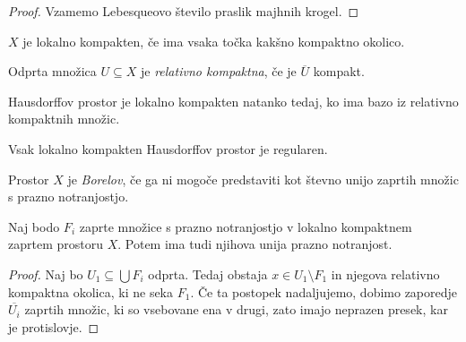 \begin{proof}
Vzamemo Lebesqueovo število praslik majhnih krogel.
\end{proof}

\begin{definicija}
$X$ je lokalno kompakten, če ima vsaka točka kakšno kompaktno
okolico.
\end{definicija}

\begin{definicija}
Odprta množica $U \subseteq X$ je \emph{relativno kompaktna}, če je
$\overline{U}$ kompakt.
\end{definicija}

\begin{trditev}
Hausdorffov prostor je lokalno kompakten natanko tedaj, ko ima bazo
iz relativno kompaktnih množic.
\end{trditev}


\begin{izrek}
Vsak lokalno kompakten Hausdorffov prostor je regularen.
\end{izrek}


\begin{definicija}
Prostor $X$ je \emph{Borelov}, če ga ni mogoče predstaviti kot
števno unijo zaprtih množic s prazno notranjostjo.
\end{definicija}

\begin{izrek}
Naj bodo $F_i$ zaprte množice s prazno notranjostjo v lokalno
kompaktnem zaprtem prostoru $X$. Potem ima tudi njihova unija
prazno notranjost.
\end{izrek}

\begin{proof}
Naj bo $U_1 \subseteq \bigcup F_i$ odprta. Tedaj obstaja
$x \in U_1 \setminus F_1$ in njegova relativno kompaktna okolica,
ki ne seka $F_1$. Če ta postopek nadaljujemo, dobimo zaporedje
$\overline{U_i}$ zaprtih množic, ki so vsebovane ena v drugi, zato
imajo neprazen presek, kar je protislovje.
\end{proof}
